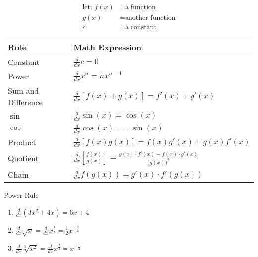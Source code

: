 \documentclass{MathNotes}
\begin{document}
\begin{align*}
    \text{let: } f(x)&= \text{a function}\\
                 g(x)&= \text{another function}\\
                   c &= \text{a constant}
\end{align*}
\begin{table}[h]
    \label{tab:2.2}
    \begin{center}
        \begin{tabular}{ |l|l| }
            \hline
            Rule & Math Expression\\
            \hline
            \hline
            Constant & $\frac{d}{dx}c=0$\\
            \hline
            Power & $\frac{d}{dx}x^n=nx^{n-1}$\\
            \hline
            Sum and Difference & $\frac{d}{dx}[f(x)\pm g(x)]=f'(x)\pm g'(x)$\\
            \hline
            $\sin$& $\frac{d}{dx}\sin(x)=\cos(x)$\\
            \hline
            $\cos$& $\frac{d}{dx}\cos(x)=-\sin(x)$\\
            \hline
            Product& 
                $\frac{d}{dx}[f(x)g(x)]=f(x)g'(x)+g(x)f'(x)$\\
            \hline
            Quotient& 
                $\frac{d}{dx}[\frac{f(x)}{g(x)}]=
                 \frac{g(x)\cdot f'(x)-f(x)\cdot g'(x)}{\bigl(g(x)\bigr)^2}$\\
            \hline
            Chain & $\frac{d}{dx}f(g(x))=g'(x)\cdot f'(g(x))$\\
            \hline
        \end{tabular}
    \end{center}
\end{table}

\begin{example}{Power Rule}
    \begin{multicols}{2}
        \begin{enumerate}
            \item $\frac{d}{dx}(3x^2+4x)=6x+4$
            \item $\frac{d}{dx}\sqrt{x}=\frac{d}{dx}x^{\frac{1}{2}}
                =\frac{1}{2}x^{-\frac{1}{2}}$
            \item $\frac{d}{dx}\sqrt[3]{x^2}=\frac{d}{dx}x^{\frac{2}{3}}
                =x^{-\frac{1}{3}}$
        \end{enumerate}
    \end{multicols}
\end{example}
\end{document}
